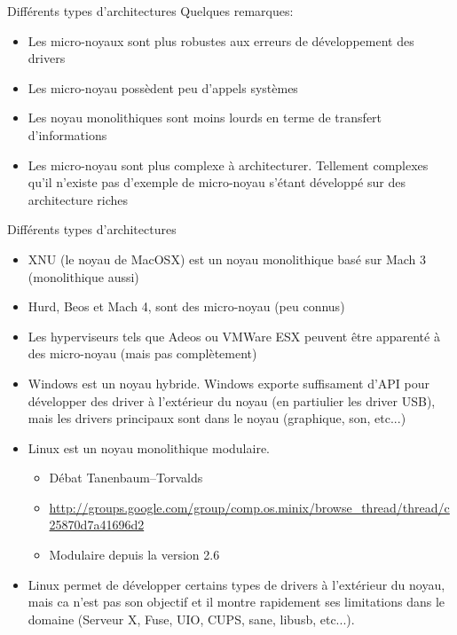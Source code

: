 \begin{frame}[fragile=singleslide]{Différents types d'architectures}
  Quelques remarques:
  \begin{itemize}
  \item   Les  micro-noyaux   sont  plus   robustes  aux   erreurs  de
    développement des drivers
  \item Les micro-noyau possèdent peu d'appels systèmes
  \item  Les  noyau  monolithiques  sont  moins  lourds  en  terme  de
    transfert d'informations
  \item Les micro-noyau sont  plus complexe à architecturer. Tellement
    complexes  qu'il  n'existe pas  d'exemple  de micro-noyau  s'étant
    développé sur des architecture riches
  \end{itemize}
\end{frame}


\begin{frame}[fragile=singleslide]{Différents types d'architectures}
  \begin{itemize}
  \item XNU  (le noyau de MacOSX)  est un noyau  monolithique basé sur
    Mach 3 (monolithique aussi)
  \item Hurd, Beos et Mach 4, sont des micro-noyau (peu connus)
  \item Les  hyperviseurs tels  que Adeos ou  VMWare ESX  peuvent être
    apparenté à des micro-noyau (mais pas complètement)
  \item  Windows est  un  noyau hybride.  Windows exporte  suffisament
    d'API  pour  développer des  driver  à  l'extérieur  du noyau  (en
    partiulier les driver USB),  mais les drivers principaux sont dans
    le noyau (graphique, son, etc...)
  \item Linux est un noyau monolithique modulaire.
    \begin{itemize}
    \item Débat Tanenbaum–Torvalds
    \item \url{http://groups.google.com/group/comp.os.minix/browse_thread/thread/c25870d7a41696d2}
    \item Modulaire depuis  la  version  2.6
    \end{itemize}
  \item  Linux  permet  de  développer  certains types  de  drivers  à
    l'extérieur du noyau, mais ca  n'est pas son objectif et il montre
    rapidement ses limitations dans  le domaine (Serveur X, Fuse, UIO,
    CUPS, sane, libusb, etc...).
\end{itemize}

\end{frame}

